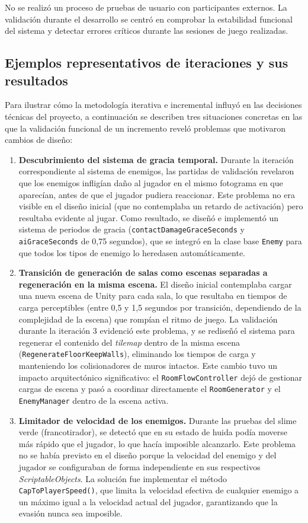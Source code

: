 No se realizó un proceso de pruebas de usuario con participantes externos. La validación durante el desarrollo se centró en comprobar la estabilidad funcional del sistema y detectar errores críticos durante las sesiones de juego realizadas.

\subsection{Ejemplos representativos de iteraciones y sus resultados}

Para ilustrar cómo la metodología iterativa e incremental influyó en las decisiones técnicas del proyecto, a continuación se describen tres situaciones concretas en las que la validación funcional de un incremento reveló problemas que motivaron cambios de diseño:

\begin{enumerate}
\item \textbf{Descubrimiento del sistema de gracia temporal.} Durante la iteración correspondiente al sistema de enemigos, las partidas de validación revelaron que los enemigos infligían daño al jugador en el mismo fotograma en que aparecían, antes de que el jugador pudiera reaccionar. Este problema no era visible en el diseño inicial (que no contemplaba un retardo de activación) pero resultaba evidente al jugar. Como resultado, se diseñó e implementó un sistema de periodos de gracia (\texttt{contactDamageGraceSeconds} y \texttt{aiGraceSeconds} de 0,75 segundos), que se integró en la clase base \texttt{Enemy} para que todos los tipos de enemigo lo heredasen automáticamente.
\item \textbf{Transición de generación de salas como escenas separadas a regeneración en la misma escena.} El diseño inicial contemplaba cargar una nueva escena de Unity para cada sala, lo que resultaba en tiempos de carga perceptibles (entre 0,5 y 1,5 segundos por transición, dependiendo de la complejidad de la escena) que rompían el ritmo de juego. La validación durante la iteración 3 evidenció este problema, y se rediseñó el sistema para regenerar el contenido del \textit{tilemap} dentro de la misma escena (\texttt{RegenerateFloorKeepWalls}), eliminando los tiempos de carga y manteniendo los colisionadores de muros intactos. Este cambio tuvo un impacto arquitectónico significativo: el \texttt{RoomFlowController} dejó de gestionar cargas de escena y pasó a coordinar directamente el \texttt{RoomGenerator} y el \texttt{EnemyManager} dentro de la escena activa.
\item \textbf{Limitador de velocidad de los enemigos.} Durante las pruebas del slime verde (francotirador), se detectó que en su estado de huida podía moverse más rápido que el jugador, lo que hacía imposible alcanzarlo. Este problema no se había previsto en el diseño porque la velocidad del enemigo y del jugador se configuraban de forma independiente en sus respectivos \textit{ScriptableObjects}. La solución fue implementar el método \texttt{CapToPlayerSpeed()}, que limita la velocidad efectiva de cualquier enemigo a un máximo igual a la velocidad actual del jugador, garantizando que la evasión nunca sea imposible.
\end{enumerate}

